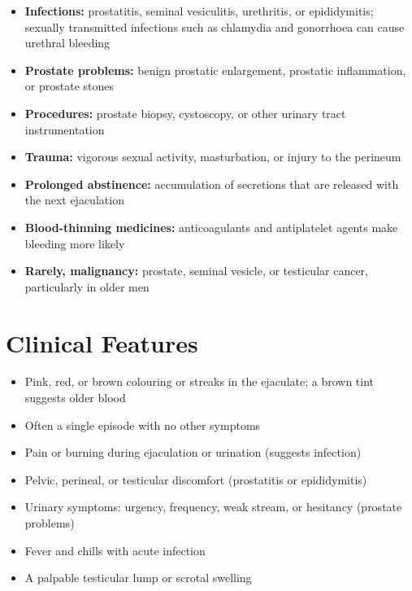 \begin{itemize}
    \item \textbf{Infections:} prostatitis, seminal vesiculitis, urethritis, or epididymitis; sexually transmitted infections such as chlamydia and gonorrhoea can cause urethral bleeding
    \item \textbf{Prostate problems:} benign prostatic enlargement, prostatic inflammation, or prostate stones
    \item \textbf{Procedures:} prostate biopsy, cystoscopy, or other urinary tract instrumentation
    \item \textbf{Trauma:} vigorous sexual activity, masturbation, or injury to the perineum
    \item \textbf{Prolonged abstinence:} accumulation of secretions that are released with the next ejaculation
    \item \textbf{Blood-thinning medicines:} anticoagulants and antiplatelet agents make bleeding more likely
    \item \textbf{Rarely, malignancy:} prostate, seminal vesicle, or testicular cancer, particularly in older men
\end{itemize}

\section*{Clinical Features}
\begin{itemize}
    \item Pink, red, or brown colouring or streaks in the ejaculate; a brown tint suggests older blood
    \item Often a single episode with no other symptoms
    \item Pain or burning during ejaculation or urination (suggests infection)
    \item Pelvic, perineal, or testicular discomfort (prostatitis or epididymitis)
    \item Urinary symptoms: urgency, frequency, weak stream, or hesitancy (prostate problems)
    \item Fever and chills with acute infection
    \item A palpable testicular lump or scrotal swelling
\end{itemize}

